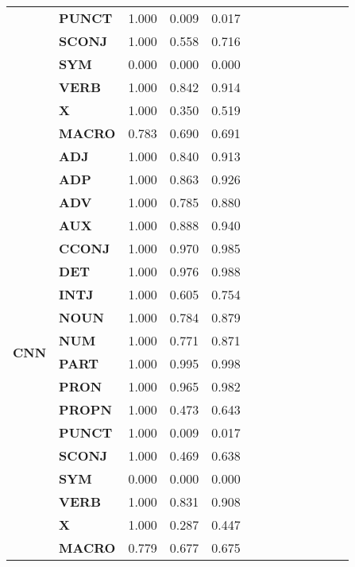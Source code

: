 \begin{longtable}{|l||l||l||l||l||l||l||l||l||l||l||l||l|}
\textbf{} & \textbf{PUNCT} & 1.000 & 0.009 & 0.017 \\
\textbf{} & \textbf{SCONJ} & 1.000 & 0.558 & 0.716 \\
\textbf{} & \textbf{SYM} & 0.000 & 0.000 & 0.000 \\
\textbf{} & \textbf{VERB} & 1.000 & 0.842 & 0.914 \\
\textbf{} & \textbf{X} & 1.000 & 0.350 & 0.519 \\
\textbf{} & \textbf{MACRO} & 0.783 & 0.690 & 0.691 \\
\cline{1-5}
\multirow[t]{18}{*}{\textbf{CNN}} & \textbf{ADJ} & 1.000 & 0.840 & 0.913 \\
\textbf{} & \textbf{ADP} & 1.000 & 0.863 & 0.926 \\
\textbf{} & \textbf{ADV} & 1.000 & 0.785 & 0.880 \\
\textbf{} & \textbf{AUX} & 1.000 & 0.888 & 0.940 \\
\textbf{} & \textbf{CCONJ} & 1.000 & 0.970 & 0.985 \\
\textbf{} & \textbf{DET} & 1.000 & 0.976 & 0.988 \\
\textbf{} & \textbf{INTJ} & 1.000 & 0.605 & 0.754 \\
\textbf{} & \textbf{NOUN} & 1.000 & 0.784 & 0.879 \\
\textbf{} & \textbf{NUM} & 1.000 & 0.771 & 0.871 \\
\textbf{} & \textbf{PART} & 1.000 & 0.995 & 0.998 \\
\textbf{} & \textbf{PRON} & 1.000 & 0.965 & 0.982 \\
\textbf{} & \textbf{PROPN} & 1.000 & 0.473 & 0.643 \\
\textbf{} & \textbf{PUNCT} & 1.000 & 0.009 & 0.017 \\
\textbf{} & \textbf{SCONJ} & 1.000 & 0.469 & 0.638 \\
\textbf{} & \textbf{SYM} & 0.000 & 0.000 & 0.000 \\
\textbf{} & \textbf{VERB} & 1.000 & 0.831 & 0.908 \\
\textbf{} & \textbf{X} & 1.000 & 0.287 & 0.447 \\
\textbf{} & \textbf{MACRO} & 0.779 & 0.677 & 0.675 \\
\cline{1-5}
\end{longtable}

